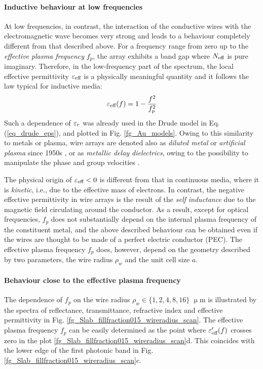 \paragraph{Inductive behaviour at low frequencies}%
At low frequencies, in contrast, the interaction of the conductive wires with the electromagnetic wave becomes very strong and leads to a behaviour completely different from that described above. For a frequency range from zero up to the \textit{effective plasma frequency} $f_p$, the array exhibits a band gap where $N_{\text{eff} }$ is pure imaginary. Therefore, in the low-frequency part of the spectrum, the local effective permittivity $\varepsilon_{\text{eff} }$ is a physically meaningful quantity and it follows the law typical for inductive media:
\begin{equation} \varepsilon_{\text{eff} }(f) = 1 - \frac{f^{2}}{f_p^{2}}\label{eq_eeff_plasma}\end{equation}
Such a dependence of $\varepsilon_r$ was already used in the Drude model in Eq. (\ref{eq_drude_eps}), and plotted in Fig. \ref{fg_Au_models}. Owing to this similarity to metals or plasma, wire arrays are denoted also as \textit{diluted metal} or \textit{artificial plasma} since 1950s \cite{merkel1973simulation, rotman1962plasma}, or as \textit{metallic delay dielectrics}, owing to the possibility to manipulate the phase and group velocities  \cite[p. 54]{brown1953artificial}.

The physical origin of $\varepsilon_{\text{eff} }<0$ is different from that in continuous media, where it is \textit{kinetic}, i.e., due to the effective mass of electrons. In contrast, the negative effective permittivity in wire arrays is the result of the \textit{self inductance} due to the magnetic field circulating around the conductor. As a result, except for optical frequencies, $f_p$ does not substantially depend on the internal plasma frequency of the constituent metal, and the above described behaviour can be obtained even if the wires are thought to be made of a perfect electric conductor (PEC).
The effective plasma frequency $f_p$ does, however, depend on the geometry described by two parameters, the wire radius $\rho_w$ and the unit cell size $a$. 

\paragraph{Behaviour close to the effective plasma frequency}%
The dependence of $f_p$ on the wire radius $\rho_w \in \{1, 2, 4, 8, 16\}$ $\upmu$m is illustrated by the spectra of reflectance, transmittance, refractive index and effective permittivity in Fig. \ref{fg_Slab_fillfraction015_wireradius_scan}. The effective plasma frequency $f_p$ can be easily determined as the point where $\varepsilon_{\text{eff} }'(f)$ crosses zero  in the plot \ref{fg_Slab_fillfraction015_wireradius_scan}d. This coincides with the lower edge of the first photonic band in Fig. \ref{fg_Slab_fillfraction015_wireradius_scan}c. 

